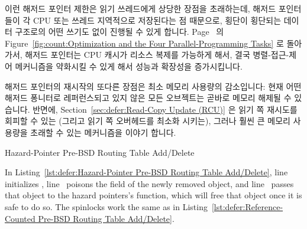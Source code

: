 이런 해저드 포인터 제한은 읽기 쓰레드에게 상당한 장점을 초래하는데, 해저드
포인터들이 각 CPU 또는 쓰레드 지역적으로 저장된다는 점 때문으로, 횡단이
횡단되는 데이터 구조로의 어떤 쓰기도 없이 진행될 수 있게 합니다.
Page~\pageref{fig:count:Optimization and the Four Parallel-Programming Tasks}
의
Figure~\ref{fig:count:Optimization and the Four Parallel-Programming Tasks}
로 돌아가서, 해저드 포인터는 CPU 캐시가 리소스 복제를 가능하게 해서, 결국
병렬-접근-제어 메커니즘을 약화시킬 수 있게 해서 성능과 확장성을 증가시킵니다.

해저드 포인터의 재시작의 또다른 장점은 최소 메모리 사용량의 감소입니다:
현재 어떤 해저드 퐁니터로 레퍼런스되고 있지 않은 모든 오브젝트는 곧바로 메모리
해제될 수 있습니다.
반면에,
Section~\ref{sec:defer:Read-Copy Update (RCU)}
은 읽기 쪽 재시도를 회피할 수 있는 (그리고 읽기 쪽 오버헤드를 최소화 시키는),
그러나 훨씬 큰 메모리 사용량을 초래할 수 있는 메커니즘을 이야기 합니다.

\begin{listing}[tbp]

\caption{Hazard-Pointer Pre-BSD Routing Table Add\slash Delete}
\label{lst:defer:Hazard-Pointer Pre-BSD Routing Table Add/Delete}
\end{listing}

\begin{lineref}
In
Listing~\ref{lst:defer:Hazard-Pointer Pre-BSD Routing Table Add/Delete},
line~ initializes ,
line~ poisons the  field of the newly removed
object, and
line~ passes that object to the hazard pointers's
 function, which will free that object once it
is safe to do so.
The spinlocks work the same as in
Listing~\ref{lst:defer:Reference-Counted Pre-BSD Routing Table Add/Delete}.
\end{lineref}

